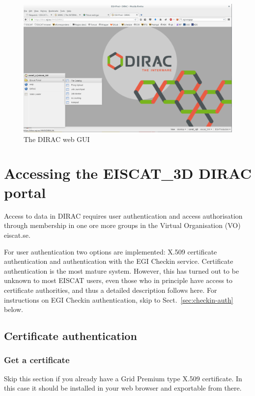 \documentclass[a4paper]{article}
\newcommand{\etd}{EISCAT\_3D}
\begin{document}
\begin{figure}[htb]
  \centering
  \includegraphics[width=1.0\linewidth]{dirac-gui-desktop}
  \caption{The DIRAC web GUI}
  \label{fig:portal}
\end{figure}

\section{Accessing the \etd{} DIRAC portal}
\label{sec:access}

Access to data in DIRAC requires user authentication and access
authorisation through membership in one ore more groups in the Virtual
Organisation (VO) eiscat.se.

For user authentication two options are implemented: X.509 certificate
authentication and authentication with the EGI Checkin service.
Certificate authentication is the most mature system. However, this has
turned out to be unknown to most EISCAT users, even those who in
principle have access to certificate authorities, and thus a detailed
description follows here. For instructions on EGI Checkin authentication,
skip to Sect.~\ref{sec:checkin-auth} below.


\subsection{Certificate authentication}
\label{sec:cert-auth}


\subsubsection{Get a certificate}
\label{sec:get-certificate}

Skip this section if you already have a Grid Premium type X.509 certificate. In this case it should be installed in your web browser and exportable from there.
\end{document}
